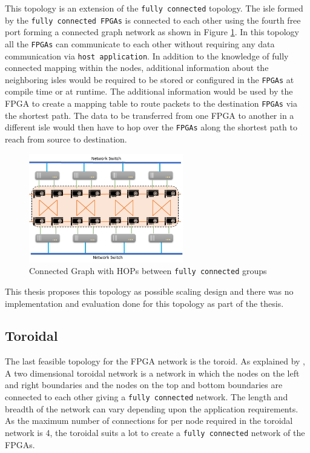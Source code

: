 This topology is an extension of the \texttt{fully connected} topology.
The isle formed by the \texttt{fully connected FPGAs} is connected
to each other using the fourth free port forming a connected graph network
as shown in Figure \ref{fig:connected_graph}.
In this topology all the \texttt{FPGAs} can communicate to each other without requiring
any data communication via \texttt{host application}. In addition to the knowledge of fully
connected mapping within the nodes, additional information about the neighboring
isles would be required to be stored or configured in the \texttt{FPGAs} at compile time
or at runtime. The additional information would be used by the FPGA to create
a mapping table to route packets to the destination \texttt{FPGAs} via the shortest path.
The data to be transferred from one FPGA to another in a different isle would
then have to hop over the \texttt{FPGAs} along the shortest path to reach
from source to destination.

\begin{figure}[h]%
    \centering
    \includegraphics[width=0.6\textwidth]{images/connected_graph}
    \caption{Connected Graph with HOPs between \texttt{fully connected} groups}
    \label{fig:connected_graph}
\end{figure}

This thesis proposes this topology as possible scaling design and there was no
implementation and evaluation done for this topology as part of the thesis.

\subsection{Toroidal}
\label{sec:toroidal}

The last feasible topology for the FPGA network is the toroid. As explained by
\textcite{robertazzi_toroidal_1988}, A two dimensional toroidal network is
a network in which the nodes on the left and right boundaries and the
nodes on the top and bottom boundaries are connected to each other giving
a \texttt{fully connected} network. The length and breadth of the network can vary
depending upon the application requirements. As the maximum number of
connections for per node required in the toroidal network is 4, the toroidal
suits a lot to create a \texttt{fully connected} network of the FPGAs.

